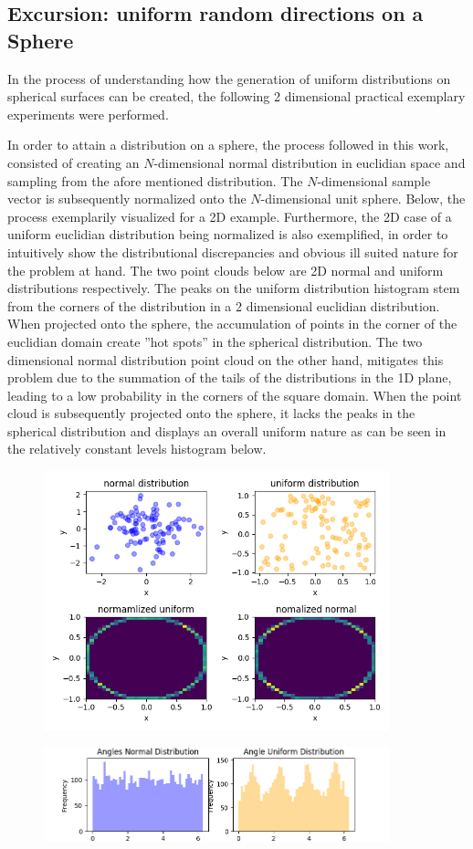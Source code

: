 \subsection{Excursion: uniform random directions on a Sphere}\label{uniformPoints}

In the process of understanding how the generation of uniform distributions on
spherical surfaces can be created, the following 2 dimensional practical exemplary
experiments were performed.

In order to attain a distribution on a sphere, the process followed in this work,
consisted of creating an $N$-dimensional normal distribution in euclidian space and
sampling from the afore mentioned distribution.  The $N$-dimensional sample vector
is subsequently normalized onto the $N$-dimensional unit sphere.  Below, the process
exemplarily visualized for a 2D example.  Furthermore, the 2D case of a uniform
euclidian distribution being normalized is also exemplified, in order to intuitively
show the distributional discrepancies and obvious ill suited nature for the problem
at hand.  The two point clouds below are 2D normal and uniform distributions
respectively.  The peaks on the uniform distribution histogram stem from the corners
of the distribution in a 2 dimensional euclidian distribution.  When projected onto
the sphere, the accumulation of points in the corner of the euclidian domain create
''hot spots'' in the spherical distribution.  The two dimensional normal
distribution point cloud on the other hand, mitigates this problem due to the summation
of the tails of the distributions in the 1D plane, leading to a low probability
in the corners of the square domain.  When the point cloud  is subsequently projected
onto the sphere, it lacks the peaks in the  spherical distribution and displays an
overall uniform nature as can be seen in the relatively constant levels  histogram below.
\begin{figure}
\begin{center}
\includegraphics[width=10.0cm]{styles/distributions} \label{plot:distributions}
  \caption{}
  \includegraphics[width=10.0cm]{styles/histograms} \label{plot:historam}
    \caption{}
\end{center}
\end{figure}



